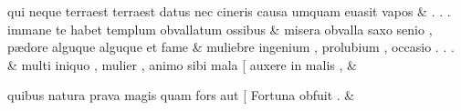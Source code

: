 \documentclass[12pt,onecolumn,twoside,a4paper]{memoir}
\begin{document}
\begin{pairs}
\begin{Leftside}
                              qui
                              neque
                              terraest
                              {terraest}
                              datus
                              nec
                              cineris
                              causa
                              umquam
                              euasit
                              vapos \&
                         \stanza {}
                     .
                              .
                              .
                              immane
                              te
                              habet
                              templum
                              obvallatum
                              ossibus \&
                         \stanza {}
                     misera
                              obvalla
                              saxo
                              senio
                              ,
                              pædore
                              alguque
                              {alguque}
                              et
                              fame \&
                         \stanza {}
                     muliebre
                              ingenium
                              ,
                              prolubium
                              ,
                              occasio
                              .
                              .
                              . \&
                         \stanza {}multi
                              iniquo
                              ,
                              mulier
                              ,
                              animo
                              sibi
                              mala
                              [
                              auxere
                              in
                              malis
                              , & 
                     
                              quibus
                              natura
                              prava
                              magis
                              quam
                              fors
                              aut
                              [
                              Fortuna
                              obfuit
                              . \&
                         \stanza {}
                     

\end{Leftside}
\end{pairs}
\end{document}
